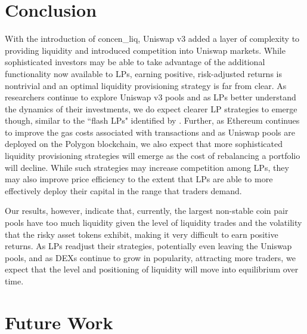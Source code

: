 \documentclass[11pt]{article}
\begin{document}
\section{Conclusion}\label{sec:6}

With the introduction of  \gls{concen_liq}, Uniswap v3 added a layer of complexity to providing liquidity and introduced competition into Uniswap markets. While sophisticated investors may be able to take advantage of the additional functionality now available to LPs, earning positive, risk-adjusted returns is nontrivial and an optimal liquidity provisioning strategy is far from clear. As researchers continue to explore Uniswap v3 pools and as LPs better understand the dynamics of their investments, we do expect clearer LP strategies to emerge though, similar to the ``flash LPs" identified by \citet{loesch2021impermanent}. Further, as Ethereum continues to improve the gas costs associated with transactions and as Uniswap pools are deployed on the Polygon blockchain, we also expect that more sophisticated liquidity provisioning strategies will emerge as the cost of rebalancing a portfolio will decline. While such strategies may increase competition among LPs, they may also improve price efficiency to the extent that LPs are able to more effectively deploy their capital in the range that traders demand.

Our results, however, indicate that, currently, the largest non-stable coin pair pools have too much liquidity given the level of liquidity trades and the volatility that the risky asset tokens exhibit, making it very difficult to earn positive returns. As LPs readjust their strategies, potentially even leaving the Uniswap pools, and as DEXs continue to grow in popularity, attracting more traders, we expect that the level and positioning of liquidity will move into equilibrium over time.

\section{Future Work}\label{}

\newpage

\end{document}
